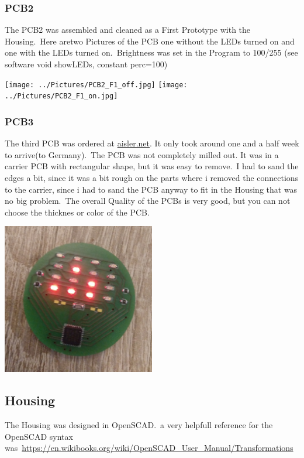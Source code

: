 \subsubsection{PCB2}
The PCB2 was assembled and cleaned as a First Prototype with the Housing.\
Here aretwo Pictures of the PCB one without the LEDs turned on and one with the LEDs turned on.\
Brightness was set in the Program to 100/255 (see software void showLEDs, constant perc=100) 
\begin{center}
\texttt{[image: ../Pictures/PCB2\_F1\_off.jpg]} \texttt{[image: ../Pictures/PCB2\_F1\_on.jpg]}

\end{center}

\subsubsection{PCB3}
The third PCB was ordered at \href{https://aisler.net}{aisler.net}. It only took around one and a half week to arrive(to Germany).\
The PCB was not completely milled out. It was in a carrier PCB with rectangular shape, but it was easy to remove.\
I had to sand the edges a bit, since it was a bit rough on the parts where i removed the connections to the carrier, since i had to sand the PCB anyway to fit in the Housing that was no big problem.\
The overall Quality of the PCBs is very good, but you can not choose the thicknes or color of the PCB.\
\begin{center}
  \includegraphics[width=0.5\textwidth]{../Pictures/PCB3.jpg}
\end{center}

\newpage

\subsection{Housing}
The Housing was designed in OpenSCAD.\
a very helpfull reference for the OpenSCAD syntax was\
\url{https://en.wikibooks.org/wiki/OpenSCAD_User_Manual/Transformations}

